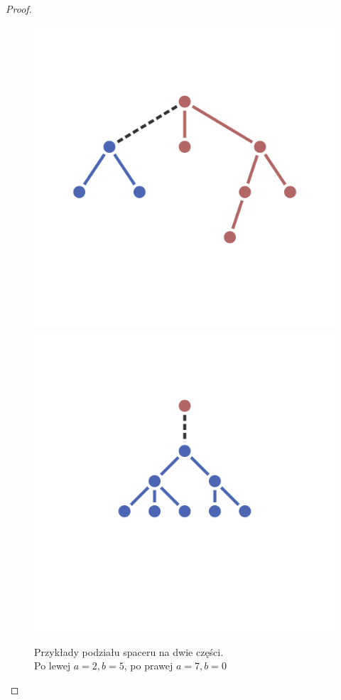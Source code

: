 \begin{proof}
         \begin{figure}[H]
                \centering
                \includegraphics[scale=0.4]{chapters/dyskretna/inclusion-exclusion/img/steiner_dp_example_1.png}
                \includegraphics[scale=0.4]{chapters/dyskretna/inclusion-exclusion/img/steiner_dp_example_2.png}
                \caption{Przykłady podziału spaceru na dwie części. \\ Po lewej $a = 2, b = 5$, po prawej $a = 7, b = 0$}
        \end{figure}
    \end{proof}

